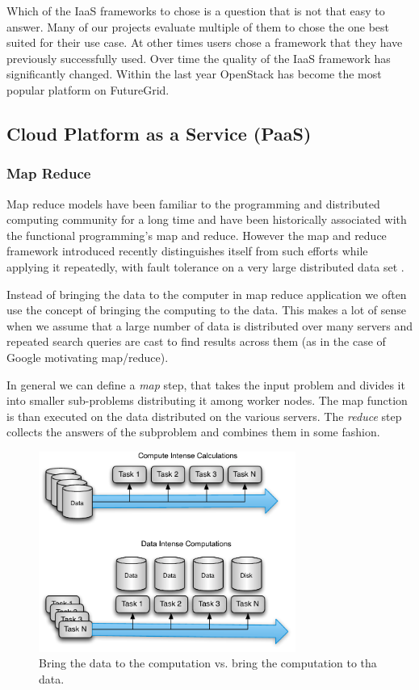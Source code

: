 \documentclass{article}
\newcommand{\FILE}[1]{}
\begin{document}
Which of the IaaS frameworks to chose is a question that is not that easy to answer. Many of our projects evaluate multiple of them to chose the one best suited for their use case. At other times users chose a framework that they have previously successfully used. Over time the quality of the IaaS framework has significantly changed. Within the last year OpenStack has become the most popular platform on FutureGrid.


\subsection{Cloud Platform as a Service (PaaS)}

\FILE{hadoop.tex}

\subsubsection{Map Reduce}

Map reduce models have been familiar to the programming and distributed computing community for a long time and have been historically associated with the functional programming's map and reduce. However the map and reduce framework introduced recently \cite{Dean:mapreduce} distinguishes itself from such efforts while applying it repeatedly, with fault tolerance on a very large distributed data set \cite{mapreduce-wikipedia}.

Instead of bringing the data to the computer in map reduce application we often use the concept of bringing the computing to the data. This makes a lot of sense when we assume that a large number of data is distributed over many servers and repeated search queries are cast to find results across them (as in the case of Google motivating map/reduce).

In general we can define a {\em map} step, that takes the input problem and divides it into smaller sub-problems distributing it among worker nodes. The map function is than executed on the data distributed on the various servers. The {\em reduce} step collects the answers of the subproblem and combines them in some fashion.

\begin{figure}[htb]
  \centering
    \includegraphics[width=0.75\textwidth]{images/mapreduce.pdf}
  \caption{Bring the data to the computation vs. bring the computation to tha data.}
\end{figure}
\end{document}
